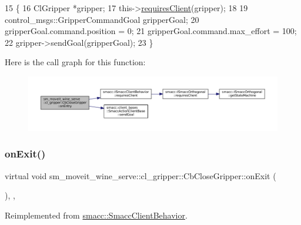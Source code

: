 \begin{DoxyCode}
15     \{
16         ClGripper *gripper;
17         this->\hyperlink{classsmacc_1_1ISmaccClientBehavior_a32b16e99e3b4cb289414203dc861a440}{requiresClient}(gripper);
18 
19         control\_msgs::GripperCommandGoal gripperGoal;
20         gripperGoal.command.position = 0;
21         gripperGoal.command.max\_effort = 100;
22         gripper->sendGoal(gripperGoal);
23     \}
\end{DoxyCode}
Here is the call graph for this function\+:
\nopagebreak
\begin{figure}[H]
\begin{center}
\leavevmode
\includegraphics[width=350pt]{classsm__moveit__wine__serve_1_1cl__gripper_1_1CbCloseGripper_a0b85c3b5f4fe003bec086fa6969bb075_cgraph}
\end{center}
\end{figure}
\mbox{\label{classsm__moveit__wine__serve_1_1cl__gripper_1_1CbCloseGripper_a50bd64b8d7ca34cd223404b54fc1aa3f}} 
\subsubsection{\texorpdfstring{on\+Exit()}{onExit()}}
{\footnotesize\ttfamily virtual void sm\+\_\+moveit\+\_\+wine\+\_\+serve\+::cl\+\_\+gripper\+::\+Cb\+Close\+Gripper\+::on\+Exit (\begin{DoxyParamCaption}{ }\end{DoxyParamCaption})\hspace{0.3cm}{\ttfamily [inline]}, {\ttfamily [override]}, {\ttfamily [virtual]}}



Reimplemented from \hyperlink{classsmacc_1_1SmaccClientBehavior_a7e4fb6ce81ff96dc172425852d69c0c5}{smacc\+::\+Smacc\+Client\+Behavior}.



